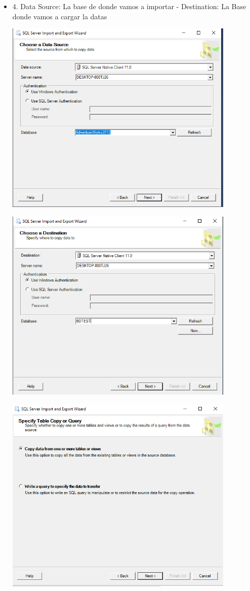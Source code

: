 \begin{itemize}
 \item 4. Data Source: La base de donde vamos a importar - Destination: La Base donde vamos a cargar la datas\\
	\begin{center}
	\includegraphics[width=11cm]{./Imagenes/imagen4}
	\end{center}	
	\begin{center}
	\includegraphics[width=11cm]{./Imagenes/imagen5}
	\end{center}	
	\begin{center}
	\includegraphics[width=11cm]{./Imagenes/imagen6}

\end{center}
\end{itemize}

